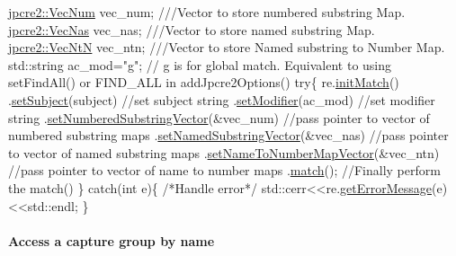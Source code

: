 \begin{DoxyCode}
\hyperlink{namespacejpcre2_ac1cf752c8fbb0be78020be3b80e77ce3}{jpcre2::VecNum} vec\_num;   \textcolor{comment}{///Vector to store numbered substring Map.}
\textcolor{comment}{}\hyperlink{namespacejpcre2_a2b121ae776ea5b2913839f418a7d856b}{jpcre2::VecNas} vec\_nas;   \textcolor{comment}{///Vector to store named substring Map.}
\textcolor{comment}{}\hyperlink{namespacejpcre2_a88a7aaf84cad627d34c8152e726168eb}{jpcre2::VecNtN} vec\_ntn;   \textcolor{comment}{///Vector to store Named substring to Number Map.}
\textcolor{comment}{}std::string ac\_mod=\textcolor{stringliteral}{"g"};   \textcolor{comment}{// g is for global match. Equivalent to using setFindAll() or FIND\_ALL in
       addJpcre2Options()}
\textcolor{keywordflow}{try}\{
    re.\hyperlink{classjpcre2_1_1Regex_a519b0915bf1163c6ce6a4d674b30cfcd}{initMatch}()
      .\hyperlink{classjpcre2_1_1RegexMatch_a635c652195deaa8ebb9e107c4f972aab}{setSubject}(subject)                         \textcolor{comment}{//set subject string}
      .\hyperlink{classjpcre2_1_1RegexMatch_a9df7e92f96b61553f62720cb8f5f23e5}{setModifier}(ac\_mod)                         \textcolor{comment}{//set modifier string}
      .\hyperlink{classjpcre2_1_1RegexMatch_a2c7efe1ec2e13827f670db4ecedcd0a0}{setNumberedSubstringVector}(&vec\_num)        \textcolor{comment}{//pass pointer to vector of
       numbered substring maps}
      .\hyperlink{classjpcre2_1_1RegexMatch_ae495431f57cae54363331237ab21b56c}{setNamedSubstringVector}(&vec\_nas)           \textcolor{comment}{//pass pointer to vector of named
       substring maps}
      .\hyperlink{classjpcre2_1_1RegexMatch_a04926e61d8b5f1d8bdf344efecd567d8}{setNameToNumberMapVector}(&vec\_ntn)          \textcolor{comment}{//pass pointer to vector of name
       to number maps}
      .\hyperlink{classjpcre2_1_1RegexMatch_a5868aef3a146594ea1ebef34d122bb33}{match}();                                    \textcolor{comment}{//Finally perform the match()}
\}
\textcolor{keywordflow}{catch}(\textcolor{keywordtype}{int} e)\{
    \textcolor{comment}{/*Handle error*/}
    std::cerr<<re.\hyperlink{classjpcre2_1_1Regex_a83b93ff7f6860757445e5edbecbfb7a2}{getErrorMessage}(e)<<std::endl;
\}
\end{DoxyCode}
\hypertarget{index_access-substring-by-name}{}\paragraph{Access a capture group by name}\label{index_access-substring-by-name}

